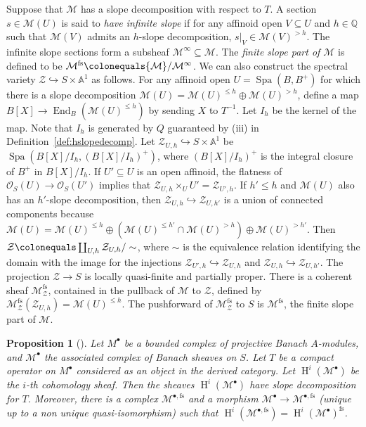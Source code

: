 \documentclass[11pt]{amsart}
\theoremstyle{definition} %
\theoremstyle{plain} %
\newtheorem{proposition}[definition]{Proposition}
\theoremstyle{remark} %
\renewcommand{\AA}{\mathbb A}
\newcommand{\QQ}{{\mathbb Q}}
\newcommand{\cM}{{\mathcal M}}
\newcommand{\cO}{{\mathcal O}}
\newcommand{\cZ}{{\mathcal Z}}
\newcommand{\defeq}{\colonequals} %
\DeclareMathOperator\End{End} %
\DeclareMathOperator\Spa{Spa} %
\newcommand{\fs}{\mathrm{fs}}
\DeclareMathOperator\rH{H}
\begin{document}
Suppose that $\cM$ has a slope decomposition with respect to $T$.
A section $s\in \cM(U)$ is said to \emph{have infinite slope} if for any affinoid open $V\subseteq U$ and $h\in\QQ$ such that $\cM(V)$ admits an $h$-slope decomposition, $\left. s\right|_V \in \cM(V)^{>h}$.
The infinite slope sections form a subsheaf $\cM^\infty\subseteq \cM$.
The \emph{finite slope part of $\cM$} is defined to be $\cM^\fs \defeq \cM/\cM^\infty$.
We can also construct the spectral variety $\cZ \hookrightarrow S\times\AA^1$ as follows.
For any affinoid open $U = \Spa (B,B^+)$ for which there is a slope decomposition $\cM(U) = \cM(U)^{\leqslant h} \oplus \cM(U)^{>h}$, define a map $B[X] \rightarrow \End_B(\cM(U)^{\leqslant h})$ by sending $X$ to $T^{-1}$. Let $I_h$ be the kernel of the map. 
Note that $I_h$ is generated by $Q$ guaranteed by (iii) in Definition~\ref{def:hslopedecomp}.
Let $\cZ_{U,h} \hookrightarrow S\times \AA^1$ be $\Spa (B[X]/I_h, (B[X]/I_h)^+)$, where $(B[X]/I_h)^+$ is the integral closure of $B^+$ in $B[X]/I_h$.
If $U'\subseteq U$ is an open affinoid, the flatness of $\cO_S(U) \rightarrow \cO_S(U')$ implies that $\cZ_{U,h}\times_{U} U' = \cZ_{U',h}$. If $h'\leqslant h$ and $\cM(U)$ also has an $h'$-slope decomposition, then $\cZ_{U,h} \hookrightarrow \cZ_{U,h'}$ is a union of connected components because $\cM(U) = \cM(U)^{\leqslant h} \oplus (\cM(U)^{\leqslant h'} \cap \cM(U)^{>h}) \oplus \cM(U)^{>h'}$.
Then $\cZ \defeq \coprod_{U,h}
 \cZ_{U,h}/\sim$, where $\sim$ is the equivalence relation identifying the domain with the image for the injections $\cZ_{U',h}\hookrightarrow \cZ_{U,h}$ and $\cZ_{U,h} \hookrightarrow \cZ_{U,h'}$. 
The projection $\cZ \rightarrow S$ is locally quasi-finite and partially proper.
There is a coherent sheaf $\cM_\cZ^{\fs}$, contained in the pullback of $\cM$ to $\cZ$, defined by $\cM_\cZ^{\fs}(\cZ_{U,h}) = \cM(U)^{\leqslant h}$.
The pushforward of $\cM_\cZ^{\fs}$ to $S$ is $\cM^{\fs}$, the finite slope part of $\cM$.

\begin{proposition}[{\cite[Prop.~6.1.11]{BP}}]
\label{prop:slope_decomp}
Let $M^\bullet$ be a bounded complex of projective Banach $A$-modules, and $\cM^\bullet$ the associated complex of Banach sheaves on $S$.
Let $T$ be a compact operator on $M^\bullet$ considered as an object in the derived category. Let $\rH^i(\cM^\bullet)$ be the $i$-th cohomology sheaf.
Then the sheaves $\rH^i(\cM^\bullet)$ have slope decomposition for $T$. Moreover, there is a complex $\cM^{\bullet,\fs}$ and a morphism $\cM^\bullet\rightarrow \cM^{\bullet, \fs}$ (unique up to a non unique quasi-isomorphism) such that $\rH^i(\cM^{\bullet,\fs}) = \rH^i(\cM^\bullet)^{\fs}$.
\end{proposition}
\end{document}
